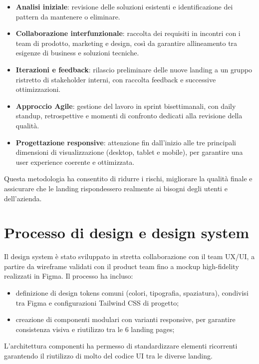 \begin{itemize}
  \item \textbf{Analisi iniziale}: revisione delle soluzioni esistenti e
  identificazione dei pattern da mantenere o eliminare.
  \item \textbf{Collaborazione interfunzionale}: raccolta dei requisiti in
  incontri con i team di prodotto, marketing e design, così da garantire
  allineamento tra esigenze di business e soluzioni tecniche.
  \item \textbf{Iterazioni e feedback}: rilascio preliminare delle nuove landing
  a un gruppo ristretto di stakeholder interni, con raccolta feedback e successive
  ottimizzazioni.
  \item \textbf{Approccio Agile}: gestione del lavoro in sprint bisettimanali,
  con daily standup, retrospettive e momenti di confronto dedicati alla revisione
  della qualità.
  \item \textbf{Progettazione responsive}: attenzione fin dall'inizio alle tre
  principali dimensioni di visualizzazione (desktop, tablet e mobile), per
  garantire una user experience coerente e ottimizzata.
\end{itemize}

Questa metodologia ha consentito di ridurre i rischi, migliorare la qualità
finale e assicurare che le landing rispondessero realmente ai bisogni degli utenti
e dell'azienda.

\section{Processo di design e design system}
Il design system è stato sviluppato in stretta collaborazione con il team UX/UI,
a partire da wireframe validati con il product team fino a mockup
high-fidelity realizzati in Figma. Il processo ha incluso:

\begin{itemize}
  \item definizione di design tokens comuni (colori, tipografia, spaziatura),
  condivisi tra Figma e configurazioni Tailwind CSS di progetto;
  \item creazione di componenti modulari con varianti responsive, per garantire 
  consistenza visiva e riutilizzo tra le 6 landing pages;
\end{itemize}

L'architettura componenti ha permesso di standardizzare elementi ricorrenti garantendo il riutilizzo di molto del codice UI tra le diverse landing.

